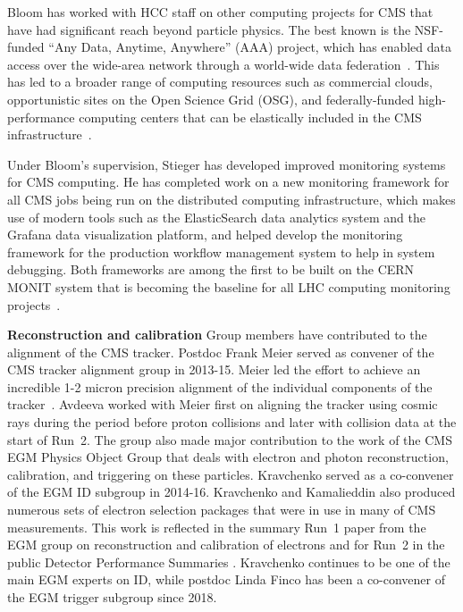 Bloom has worked with HCC staff on other computing projects for CMS that have had significant reach beyond particle physics.  The best known is the NSF-funded ``Any Data, Anytime, Anywhere'' (AAA) project, which has enabled data access over the wide-area network through a world-wide data federation~\cite{bib:AAA}.  This has led to a broader range of computing resources such as commercial clouds, opportunistic sites on the Open Science Grid (OSG), and federally-funded high-performance computing centers that can be elastically included in the CMS infrastructure~\cite{bib:hepcloud}.

Under Bloom's supervision, Stieger has developed improved monitoring systems for CMS computing. He has completed work on a new monitoring framework for all CMS jobs being run on the distributed computing infrastructure, which makes use of modern tools such as the ElasticSearch data analytics system and the Grafana data visualization platform, and helped develop the monitoring framework for the production workflow management system to help in system debugging.  Both frameworks are among the first to be built on the CERN MONIT system that is becoming the baseline for all LHC computing monitoring projects~\cite{bib:MONIT}.

{\bf Reconstruction and calibration}
Group members have contributed to the alignment of the CMS tracker.  Postdoc Frank Meier served as convener of the CMS tracker alignment group in 2013-15.  Meier led the effort to achieve an incredible 1-2 micron precision alignment of the individual components of the  tracker~\cite{bib:alignment}.  Avdeeva worked with Meier first on aligning the tracker using cosmic rays during the period before proton collisions and later with collision data at the start of Run~2. The group also made major contribution to the work of the CMS EGM Physics Object Group that deals with electron and photon reconstruction, calibration, and triggering on these particles. Kravchenko served as a co-convener of the EGM ID subgroup in 2014-16. Kravchenko and Kamalieddin also produced numerous sets of electron selection packages that were in use in many of CMS measurements. This work is reflected in the summary Run~1 paper from the EGM group on reconstruction and calibration of electrons \cite{bib:EGM-Run1} and for Run~2 in the public Detector Performance Summaries \cite{bib:EGM-Run2-DP}. Kravchenko continues to be one of the main EGM experts on ID, while postdoc Linda Finco has been a co-convener of the EGM trigger subgroup since 2018.


